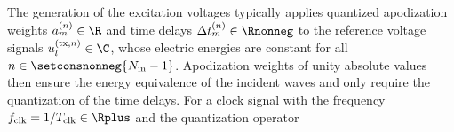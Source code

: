 The generation of
the excitation voltages typically applies
quantized apodization weights
$a_{m}^{(n)} \in \R$ and
time delays
$\Delta t_{m}^{(n)} \in \Rnonneg$ to
the reference voltage signals
$u_{l}^{(\text{tx}, n)} \in \C$, whose electric energies are
constant for
all $n \in \setconsnonneg{ N_{\text{in}} - 1 }$.
Apodization weights of
unity absolute values then ensure
the energy equivalence of
the incident waves and only require
the quantization of
the time delays.
For
a clock signal with
the frequency
$f_{\text{clk}} = 1 / T_{\text{clk}} \in \Rplus$ and
the quantization operator
